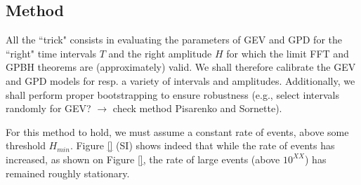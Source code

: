 \subsection*{Method}
All the ``trick" consists in evaluating the parameters of GEV and GPD for the ``right" time intervals $T$ and the right amplitude $H$ for which the limit FFT and GPBH theorems are (approximately) valid. We shall therefore calibrate the GEV and GPD models for resp. a variety of intervals and amplitudes. Additionally, we shall perform proper bootstrapping to ensure robustness (e.g., select intervals randomly for GEV? $\rightarrow$ check method Pisarenko and Sornette).

For this method to hold, we must assume a constant rate of events, above some threshold $H_{min}$. Figure \ref{} (SI) shows indeed that while the rate of events has increased, as shown on Figure \ref{}, the rate of large events (above $10^{XX}$) has remained roughly stationary. 




